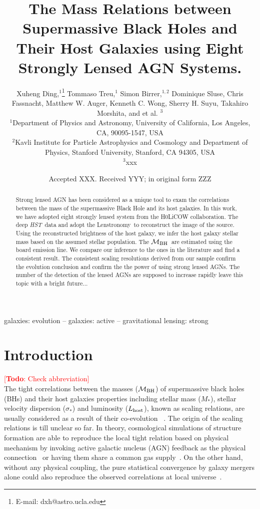 \documentclass[fleqn,usenatbib]{mnras}
\title[Mass relations by lensed AGN hosts]{The Mass Relations between Supermassive Black Holes and Their Host Galaxies using Eight Strongly Lensed AGN Systems.}
\author[X. Ding et al.]{
Xuheng Ding,$^{1}$\thanks{E-mail: dxh@astro.ucla.edu}
Tommaso Treu,$^{1}$
Simon Birrer,$^{1, 2}$
Dominique Sluse,\newauthor
Chris Fassnacht,
Matthew W. Auger,
Kenneth C. Wong,
Sherry H. Suyu,\newauthor
Takahiro Morshita,
and et al. $^{3}$
\\
$^{1}$Department of Physics and Astronomy, University of California, Los Angeles, CA, 90095-1547, USA\\
$^{2}$Kavli Institute for Particle Astrophysics and Cosmology and Department of Physics, Stanford University, Stanford, CA 94305, USA\\
$^{3}$xxx
}
\date{Accepted XXX. Received YYY; in original form ZZZ}
\newcommand{\hst}{{\it HST}}
\newcommand{\mbh}{$\mathcal M_{\rm BH}$}
\newcommand{\lhost}{$L_{\rm host}$}
\newcommand{\lenstronomy}{{\sc Lenstronomy}}
\newcommand{\mstar}{{$M_*$}}
\newcommand{\todo}[1]{\textcolor{red}{[{\bf Todo}: #1]}}
\begin{document}
\label{firstpage}
\pagerange{\pageref{firstpage}--\pageref{lastpage}}
\maketitle

\begin{abstract}
Strong lensed AGN has been considered as a unique tool to exam the correlations between the mass of the supermassive Black Hole and its host galaxies. In this work, we have adopted eight strongly lensed system from the H0LiCOW collaboration. The deep \hst\ data and adopt the \lenstronomy\ to reconstruct the image of the source. Using the reconstructed brightness of the host galaxy, we infer the host galaxy stellar mass based on the assumed stellar population. 
The \mbh\ are estimated using the board emission line. We compare our inference to the ones in the literature and find a consistent result. The consistent scaling resolutions derived from our sample confirm the evolution conclusion and confirm the the power of using strong lensed AGNs. The number of the detection of the lensed AGNs are supposed to increase rapidly leave this topic with a bright future...
\end{abstract}

\begin{keywords}
galaxies: evolution -- galaxies: active -- gravitational lensing: strong
\end{keywords}


\section{Introduction}
\todo{Check abbreviation}\\
The tight correlations between the masses (\mbh) of supermassive black holes (BHs) and their host galaxies properties including stellar mass (\mstar), stellar velocity dispersion ($\sigma_*$) and luminosity (\lhost), known as scaling relations, are usually considered as a result of their co-evolution ~\citep[e.g.,][]{Mag++98, F+M00, Geb++01b, M+H03, Gul++09,Beifi2012, H+R04, Gra++2011}. The origin of the scaling relations is till unclear so far. In theory, cosmological simulations of structure formation are able to reproduce the local tight relation based on physical mechanism by invoking active galactic nucleus (AGN) feedback as the physical connection~\citep{Springel2005, Hopkins2008, Matteo2008, DeG++15} or having them share a common gas supply~\citep{Cen2015, Menci2016}. On the other hand, without any physical coupling, the pure statistical convergence by galaxy mergers alone could also reproduce the observed correlations at local universe~\citep{Peng2007, Jahnke2011, Hirschmann2010}. 
\end{document}
